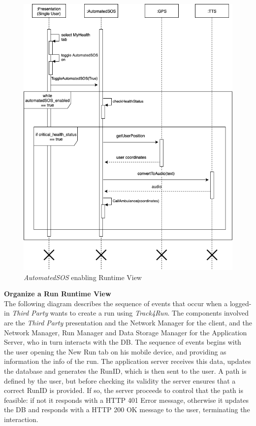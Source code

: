 \documentclass[titlepage]{article}
\begin{document}
	\begin{figure}[H]
		\center
		\includegraphics[width=13cm]{SOS.png}
		\caption{{\it AutomatedSOS} enabling Runtime View}
		\label{fig:SOS}
	\end{figure}
	\noindent
	{\bf Organize a Run Runtime View }\\ 
	The following diagram describes the sequence of events that occur when a logged-in {\it Third Party} wants to create a run using {\it Track4Run}.
	The components involved are the {\it Third Party} presentation and the Network Manager for the client, and the Network Manager, Run Manager and Data Storage Manager for the Application Server, who in turn interacts with the DB.
	The sequence of events begins with the user opening the New Run tab on his mobile device, and providing as information the info of the run. The application server receives this data, updates the database and generates the RunID, which is then sent to the user. A path is defined by the user, but before checking its validity the server ensures that a correct RunID is provided. If so, the server proceeds to control that the path is feasible: if not it responds with a HTTP 401 Error message, otherwise it updates the DB and responds with a HTTP 200 OK message to the user, terminating the interaction.
	
\end{document}
